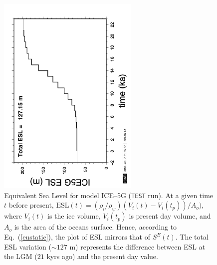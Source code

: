\documentclass[11pt,fleqn,a4paper,titlepage]{article}
\begin{document}
\begin{figure}[h]
\begin{center}
\vspace{1cm}
\includegraphics[width=0.6\textwidth, angle=-90]{./Figures/esl.png}
\caption[Equivalent Sea Level]{\small{Equivalent Sea Level for model ICE--5G \citep{Peltier_2004}
(\texttt{TEST} run). At a given time $t$ before present, 
$\textrm{ESL}(t)= (\rho_i/\rho_w)(V_{i}(t)-V_{i}(t_{p}))/A_{o})$, where  $V_{i}(t)$ is the ice volume, 
$V_{i}(t_{p})$ is present day volume, and $A_{o}$ is the area of the oceans surface. Hence, 
according to Eq.~(\ref{eustatic}), the plot of ESL mirrors that of $S^{E}(t)$. The total
ESL variation ($\sim 127$ m) represents the difference between ESL at the LGM ($21$ kyrs ago) and the present day value.}}
\label{fig:eustatic}
\end{center}
\end{figure}
\clearpage
\end{document}
